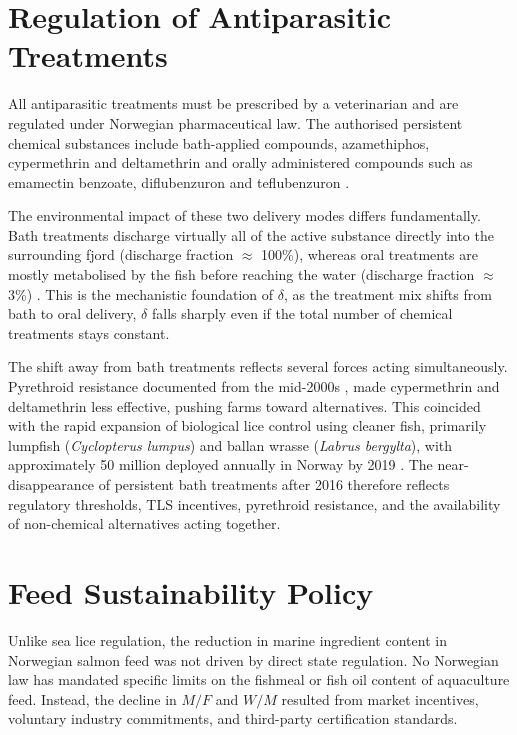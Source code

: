 \documentclass[12pt, a4paper]{report}
\begin{document}
\section{Regulation of Antiparasitic Treatments}

All antiparasitic treatments must be prescribed by a veterinarian and are regulated under Norwegian pharmaceutical law. The authorised persistent chemical substances include bath-applied compounds, azamethiphos, cypermethrin and deltamethrin and orally administered compounds such as emamectin benzoate, diflubenzuron and teflubenzuron \citep{samuelsen2020}.

The environmental impact of these two delivery modes differs fundamentally. Bath treatments discharge virtually all of the active substance directly into the surrounding fjord (discharge fraction $\approx$ 100\%), whereas oral treatments are mostly metabolised by the fish before reaching the water (discharge fraction $\approx$ 3\%) \citep{myhrjensen2020}. This is the mechanistic foundation of $\delta$, as the treatment mix shifts from bath to oral delivery, $\delta$ falls sharply even if the total number of chemical treatments stays constant.

The shift away from bath treatments reflects several forces acting simultaneously. Pyrethroid resistance documented from the mid-2000s \citep{sciencedirect2020b}, made cypermethrin and deltamethrin less effective, pushing farms toward alternatives. This coincided with the rapid expansion of biological lice control using cleaner fish, primarily lumpfish (\textit{Cyclopterus lumpus}) and ballan wrasse (\textit{Labrus bergylta}), with approximately 50 million deployed annually in Norway by 2019 \citep{barrett2020}. The near-disappearance of persistent bath treatments after 2016 therefore reflects regulatory thresholds, TLS incentives, pyrethroid resistance, and the availability of non-chemical alternatives acting together. %

\section{Feed Sustainability Policy}


Unlike sea lice regulation, the reduction in marine ingredient content in Norwegian salmon feed was not driven by direct state regulation. No Norwegian law has mandated specific limits on the fishmeal or fish oil content of aquaculture feed. Instead, the decline in $M/F$ and $W/M$ resulted from market incentives, voluntary industry commitments, and third-party certification standards.
\end{document}
